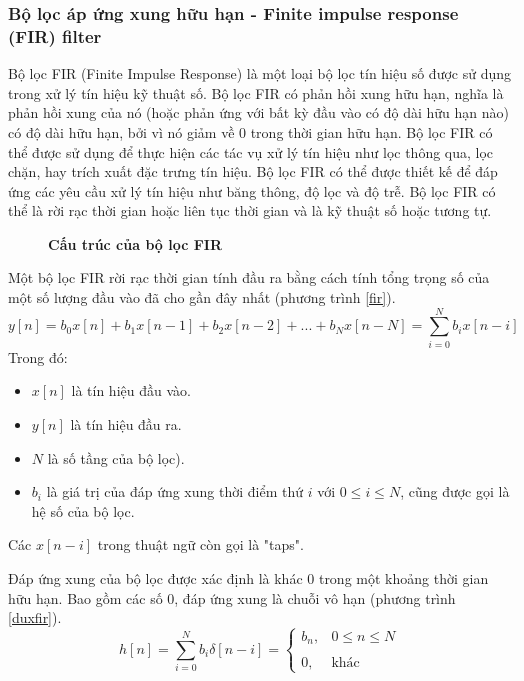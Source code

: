 \subsubsection{Bộ lọc áp ứng xung hữu hạn -  Finite impulse response (FIR) filter}
Bộ lọc FIR (Finite Impulse Response) là một loại bộ lọc tín hiệu số được sử dụng trong xử lý tín hiệu kỹ thuật số. Bộ lọc FIR có phản hồi xung hữu hạn, nghĩa là phản hồi xung của nó (hoặc phản ứng với bất kỳ đầu vào có độ dài hữu hạn nào) có độ dài hữu hạn, bởi vì nó giảm về 0 trong thời gian hữu hạn. Bộ lọc FIR có thể được sử dụng để thực hiện các tác vụ xử lý tín hiệu như lọc thông qua, lọc chặn, hay trích xuất đặc trưng tín hiệu. Bộ lọc FIR có thể được thiết kế để đáp ứng các yêu cầu xử lý tín hiệu như băng thông, độ lọc và độ trễ. Bộ lọc FIR có thể là rời rạc thời gian hoặc liên tục thời gian và là kỹ thuật số hoặc tương tự. \cite{8256573}
\begin{figure}[H]
    \centering
    
    \caption[Cấu trúc của bộ lọc FIR]{\bfseries \fontsize{12pt}{0pt}\selectfont Cấu trúc của bộ lọc FIR}
    \label{FIR_Filter}
\end{figure}
Một bộ lọc FIR rời rạc thời gian tính đầu ra bằng cách tính tổng trọng số của một số lượng đầu vào đã cho gần đây nhất (phương trình \ref{fir}).
\begin{equation}\label{fir}
       y[n]= b_0x[n] + b_1x[n-1] + b_2x[n-2] + ... + b_Nx[n-N] = \sum^{N}_{i=0}b_ix[n - i]
\end{equation}
Trong đó:
\begin{itemize}
  \item $x[n]$ là tín hiệu đầu vào.
  \item $y[n]$ là tín hiệu đầu ra.
  \item $N$ là số tầng của bộ lọc).
  \item $b_i$ là giá trị của đáp ứng xung thời điểm thứ $i$ với $0 \leq i \leq N$, cũng được gọi là hệ số của bộ lọc.
\end{itemize}

Các $x[n-i]$ trong thuật ngữ còn gọi là "taps". 

Đáp ứng xung của bộ lọc được xác định là khác 0 trong một khoảng thời gian hữu hạn. Bao gồm các số 0, đáp ứng xung là chuỗi vô hạn (phương trình \ref{duxfir}).
\begin{equation}\label{duxfir}
    h[n] = \sum ^{N}_{i=0}b_i\delta[n-i]=\left\{\begin{matrix}b_n,& 0 \leq n \leq N
    \\&
\\ 0, & \text{khác}
\end{matrix}\right.
\end{equation}

